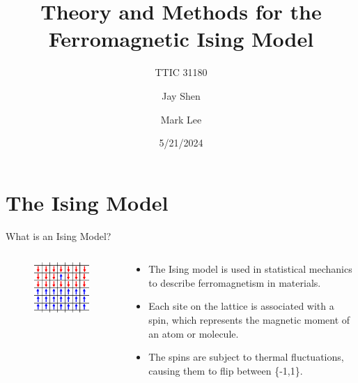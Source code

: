 \documentclass{minesbeamer}
\title{Theory and Methods for the Ferromagnetic Ising Model}
\subtitle{TTIC 31180}
\author[Jay Shen \and Mark Lee]{Jay Shen \and Mark Lee}
\date{5/21/2024} %
\begin{document}
\maketitle

\section{The Ising Model}

\begin{frame}{What is an Ising Model?}
    \begin{columns}
        \begin{column}{0.6\textwidth}
            \begin{figure}
                \centering
                \includegraphics[height=0.7\textheight]{monte-carlo-ising-2.png}
            \end{figure}
        \end{column}
        \begin{column}{0.5\textwidth}
            \begin{itemize}
                \item The Ising model is used in statistical mechanics to describe ferromagnetism in materials.
                \item Each site on the lattice is associated with a spin, which represents the magnetic moment of an atom or molecule.
                \item The spins are subject to thermal fluctuations, causing them to flip between \{-1,1\}.
            \end{itemize}
        \end{column}
    \end{columns}
\end{frame}
\end{document}
